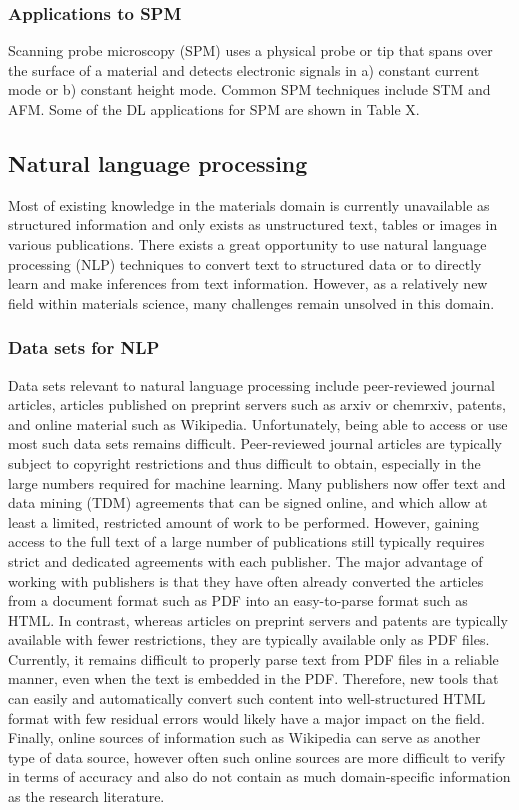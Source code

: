 \documentclass[pdflatex,sn-mathphys]{sn-jnl}%
\theoremstyle{thmstyleone}%
\theoremstyle{thmstyletwo}%
\theoremstyle{thmstylethree}%
\begin{document}
\subsubsection{Applications to SPM}
Scanning probe microscopy (SPM) uses a physical probe or tip that spans over the surface of a material and detects electronic signals in a) constant current mode or b) constant height mode. Common SPM techniques include STM and AFM. Some of the DL applications for SPM are shown in Table X.

\subsection{Natural language processing}\label{sec:nlp}

Most of existing knowledge in the materials domain is currently unavailable as structured information and only exists as unstructured text, tables or images in various publications. There exists a great opportunity to use natural language processing (NLP) techniques to convert text to structured data or to directly learn and make inferences from text information. However, as a relatively new field within materials science, many challenges remain unsolved in this domain.


\subsubsection{Data sets for NLP}

Data sets relevant to natural language processing include peer-reviewed journal articles, articles published on preprint servers such as arxiv or chemrxiv, patents, and online material such as Wikipedia. Unfortunately, being able to access or use most such data sets remains difficult. Peer-reviewed journal articles are typically subject to copyright restrictions and thus difficult to obtain, especially in the large numbers required for machine learning. Many publishers now offer text and data mining (TDM) agreements that can be signed online, and which allow at least a limited, restricted amount of work to be performed. However, gaining access to the full text of a large number of publications still typically requires strict and dedicated agreements with each publisher. The major advantage of working with publishers is that they have often already converted the articles from a document format such as PDF into an easy-to-parse format such as HTML. In contrast, whereas articles on preprint servers and patents are typically available with fewer restrictions, they are typically available only as PDF files. Currently, it remains difficult to properly parse text from PDF files in a reliable manner, even when the text is embedded in the PDF. Therefore, new tools that can easily and automatically convert such content into well-structured HTML format with few residual errors would likely have a major impact on the field. Finally, online sources of information such as Wikipedia can serve as another type of data source, however often such online sources are more difficult to verify in terms of accuracy and also do not contain as much domain-specific information as the research literature.
\end{document}
